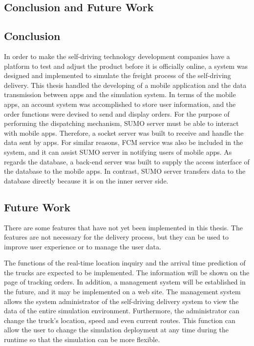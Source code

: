 \documentclass[12pt]{ksthesis}
\begin{document}
\begin{thesis}
{%







\chapter{Conclusion and Future Work} \label{Chap:Conclusion}

\section{Conclusion}
In order to make the self-driving technology development companies have a platform to test and adjust the product before it is officially online, a system was designed and implemented to simulate the freight process of the self-driving delivery. This thesis handled the developing of a mobile application and the data transmission between apps and the simulation system. In terms of the mobile apps, an account system was accomplished to store user information, and the order functions were devised to send and display orders. For the purpose of performing the dispatching mechanism, SUMO server must be able to interact with mobile apps. Therefore, a socket server was built to receive and handle the data sent by apps. For similar reasons, FCM service was also be included in the system, and it can assist SUMO server in notifying users of mobile apps. As regards the database, a back-end server was built to supply the access interface of the database to the mobile apps. In contrast, SUMO server transfers data to the database directly because it is on the inner server side.


\section{Future Work}

There are some features that have not yet been implemented in this thesis. The features are not necessary for the delivery process, but they can be used to improve user experience or to manage the user data. 

The functions of the real-time location inquiry and the arrival time prediction of the trucks are expected to be implemented. The information will be shown on the page of tracking orders. In addition, a management system will be established in the future, and it may be implemented on a web site. The management system allows the system administrator of the self-driving delivery system to view the data of the entire simulation environment. Furthermore, the administrator can change the truck's location, speed and even current routes. This function can allow the user to change the simulation deployment at any time during the runtime so that the simulation can be more flexible.



} \end{thesis}
\end{document}
